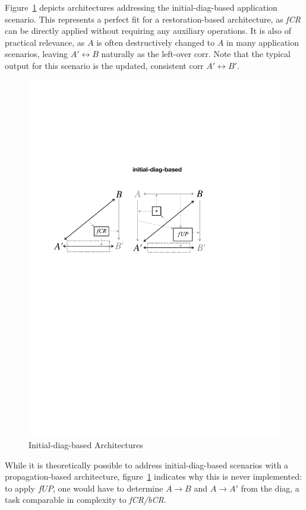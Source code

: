 Figure~\ref{fig:initialDiagBased} depicts architectures addressing the initial-diag-based application scenario.
This represents a perfect fit for a restoration-based architecture, as \emph{fCR} can be directly applied without requiring any auxiliary operations.
It is also of practical relevance, as $A$ is often destructively changed to $A$ in many application scenarios, leaving $A' \leftrightarrow B$ naturally as the left-over corr. 
Note that the typical output for this scenario is the updated, consistent corr $A' \leftrightarrow B'$.
%
\begin{figure}[tb!]
	\centering
	\includegraphics[width=0.755\columnwidth]{diagrams/foundations/initial-diag-based}
	\caption{Initial-diag-based Architectures}
	\label{fig:initialDiagBased}
\end{figure}
%
While it is theoretically possible to address initial-diag-based scenarios with a propagation-based architecture, figure~\ref{fig:initialDiagBased} indicates why this is never implemented: to apply $\mathit{fUP}$, one would have to determine $A \rightarrow B$ and $A \rightarrow A'$ from the diag, a task  comparable in complexity to \emph{fCR/bCR}.

